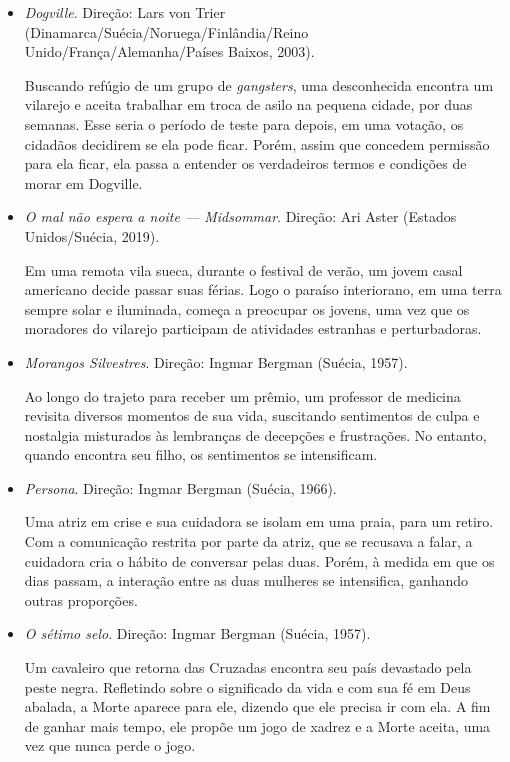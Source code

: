 \documentclass[12pt]{extarticle}
\begin{document}
\begin{itemize}
\item \textit{Dogville}. Direção: Lars von Trier (Dinamarca/Suécia/Noruega/Finlândia/Reino Unido/França/Alemanha/Países Baixos, 2003).

Buscando refúgio de um grupo de \emph{gangsters}, uma desconhecida encontra um 
vilarejo e aceita trabalhar em troca de asilo na pequena cidade, por duas 
semanas. Esse seria o período de teste para depois, em uma votação, os 
cidadãos decidirem se ela pode ficar. Porém, assim que concedem permissão 
para ela ficar, ela passa a entender os verdadeiros termos e condições de 
morar em Dogville.

\item \textit{O mal não espera a noite --- Midsommar}. Direção: Ari Aster (Estados Unidos/Suécia, 2019).

Em uma remota vila sueca, durante o festival de verão, um jovem casal 
americano decide passar suas férias. Logo o paraíso interiorano, em uma 
terra sempre solar e iluminada, começa a preocupar os jovens, uma vez que 
os moradores do vilarejo participam de atividades estranhas e perturbadoras.

\item \textit{Morangos Silvestres}. Direção: Ingmar Bergman (Suécia, 1957).

Ao longo do trajeto para receber um prêmio, um professor de medicina 
revisita diversos momentos de sua vida, suscitando sentimentos de culpa 
e nostalgia misturados às lembranças de decepções e frustrações. 
No entanto, quando encontra seu filho, os sentimentos se intensificam.

\item \textit{Persona}. Direção: Ingmar Bergman (Suécia, 1966).

Uma atriz em crise e sua cuidadora se isolam em uma praia, 
para um retiro. Com a comunicação restrita por parte da atriz, 
que se recusava a falar, a cuidadora cria o hábito de conversar 
pelas duas. Porém, à medida em que os dias passam, a interação entre as 
duas mulheres se intensifica, ganhando outras proporções. 

\item \textit{O sétimo selo}. Direção: Ingmar Bergman (Suécia, 1957).

Um cavaleiro que retorna das Cruzadas encontra seu país devastado 
pela peste negra. Refletindo sobre o significado da vida e com sua fé 
em Deus abalada, a Morte aparece para ele, dizendo que ele precisa ir 
com ela. A fim de ganhar mais tempo, ele propõe um jogo de xadrez 
e a Morte aceita, uma vez que nunca perde o jogo.
\end{itemize}
\end{document}
